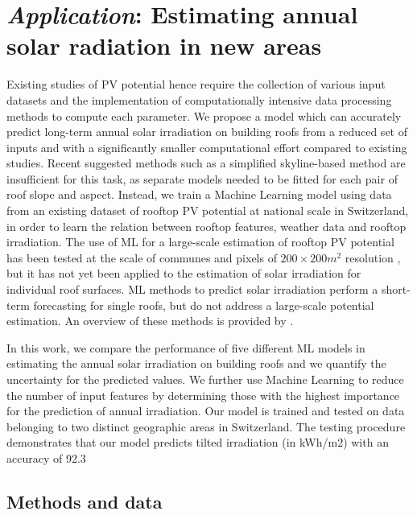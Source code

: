 \section{\textit{Application}: Estimating annual solar radiation in new areas}
\label{solar_application}
Existing studies of PV potential hence require the collection of various input datasets and the implementation of computationally intensive data processing methods to compute each parameter. We propose a model which can accurately predict long-term annual solar irradiation on building roofs from a reduced set of inputs and with a significantly smaller computational effort compared to existing studies. Recent suggested methods such as a simplified skyline-based method \cite{calcabrini_simplified_2019} are insufficient for this task, as separate models needed to be fitted for each pair of roof slope and aspect. Instead, we train a Machine Learning model using data from an existing dataset of rooftop PV potential at national scale in Switzerland, in order to learn the relation between rooftop features, weather data and rooftop irradiation. The use of ML for a large-scale estimation of rooftop PV potential has been tested at the scale of communes \cite{assouline_quantifying_2017} and pixels of $200 \times 200m^2$ resolution \cite{assouline_large-scale_2018}, but it has not yet been applied to the estimation of solar irradiation for individual roof surfaces. 
ML methods to predict solar irradiation perform a short-term forecasting for single roofs, but do not address a large-scale potential estimation. An overview of these methods is provided by \citet{voyant_machine_2017}. 

In this work, we compare the performance of five different ML models in estimating the annual solar irradiation on building roofs and we quantify the uncertainty for the predicted values. We further use Machine Learning to reduce the number of input features by determining those with the highest importance for the prediction of annual irradiation. Our model is trained and tested on data belonging to two distinct geographic areas in Switzerland. The testing procedure demonstrates that our model predicts tilted irradiation (in kWh/m2) with an accuracy of 92.3%

\subsection{Methods and data}
\label{chile_method}

